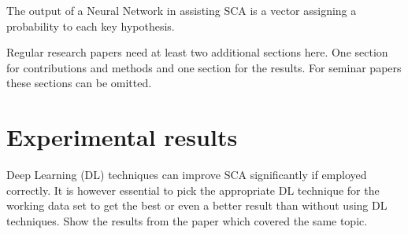 \documentclass[journal]{IEEEtran}
\begin{document}
The output of a Neural Network in assisting SCA is a vector assigning a probability to each key hypothesis. 

Regular research papers need at least two additional sections here. One section
for contributions and methods and one section for the results. For seminar
papers these sections can be omitted. 

\section{Experimental results}
Deep Learning (DL) techniques can improve SCA significantly if employed correctly. It is however essential to pick the appropriate DL technique for the working data set to get the best or even a better result than without using DL techniques. 
Show the results from the paper which covered the same topic.

%
%

%
%
\end{document}
